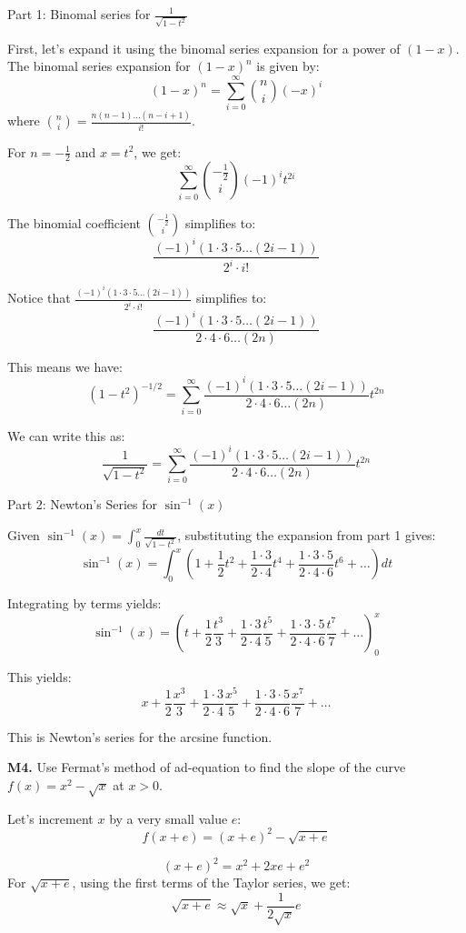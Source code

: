 \documentclass{article}
\begin{document}
Part 1: Binomal series for $\frac{1}{\sqrt{1-t^2}}$

First, let's expand it using the binomal series expansion for a power
of $(1-x)$. The binomal series expansion for $(1-x)^n$ is given by:
\[(1-x)^n = \sum_{i=0}^{\infty} \binom{n}{i} (-x)^i\]
where $\binom{n}{i} = \frac{n(n-1)\dots(n-i+1)}{i!}$.

For $n = -\frac{1}{2}$ and $x = t^2$, we get:
\[\sum_{i=0}^{\infty} \binom{-\frac{1}{2}}{i} (-1)^i t^{2i}\]

The binomial coefficient $\binom{-\frac{1}{2}}{i}$ simplifies to:
\[\frac{(-1)^i (1 \cdot 3 \cdot 5 \dots (2i-1))}{2^i \cdot i!}\]

Notice that $\frac{(-1)^i (1 \cdot 3 \cdot 5 \dots (2i-1))}{2^i \cdot i!}$ simplifies to:
\[\frac{(-1)^i (1 \cdot 3 \cdot 5 \dots (2i-1))}{2 \cdot 4 \cdot 6 \dots (2n)}\]

This means we have:
\[(1-t^2)^{-1/2} = \sum_{i=0}^{\infty} \frac{(-1)^i (1 \cdot 3 \cdot 5 \dots (2i-1))}{2 \cdot 4 \cdot 6 \dots (2n)} t^{2n}\]

We can write this as:
\[\frac{1}{\sqrt{1-t^2}} = \sum_{i=0}^{\infty} \frac{(-1)^i (1 \cdot 3 \cdot 5 \dots (2i-1))}{2 \cdot 4 \cdot 6 \dots (2n)} t^{2n}\]

Part 2: Newton's Series for $\sin^{-1}(x)$

Given $\sin^{-1}(x) = \int_{0}^x \frac{dt}{\sqrt{1 - t^2}}$,
substituting the expansion from part 1 gives:
\[\sin^{-1}(x) = \int_{0}^x (1 + \frac{1}{2}t^2 + \frac{1 \cdot 3}{2 \cdot 4} t^4 + \frac{1 \cdot 3 \cdot 5}{2 \cdot 4 \cdot 6} t^6 + \dots) dt\]

Integrating by terms yields:
\[\sin^{-1}(x) = \left(t + \frac{1}{2} \frac{t^3}{3} + \frac{1 \cdot 3}{2 \cdot 4} \frac{t^5}{5} + \frac{1 \cdot 3 \cdot 5}{2 \cdot 4 \cdot 6} \frac{t^7}{7} + \dots\right)_{0}^x\]

This yields:
\[x + \frac{1}{2} \frac{x^3}{3} + \frac{1 \cdot 3}{2 \cdot 4} \frac{x^5}{5} + \frac{1 \cdot 3 \cdot 5}{2 \cdot 4 \cdot 6} \frac{x^7}{7} + \dots\]

This is Newton's series for the arcsine function.


\textbf{M4.} Use Fermat's method of ad-equation to find the slope
of the curve $f(x) = x^2 - \sqrt{x}$ at $x > 0$.

Let's increment $x$ by a very small value $e$:
\[f(x+e) = (x+e)^2 - \sqrt{x+e}\]

\[(x+e)^2 = x^2 + 2xe + e^2\]
For $\sqrt{x+e}$, using the first terms of the Taylor series, we get:
\[\sqrt{x+e} \approx \sqrt{x} + \frac{1}{2 \sqrt{x}} e\]
\end{document}

